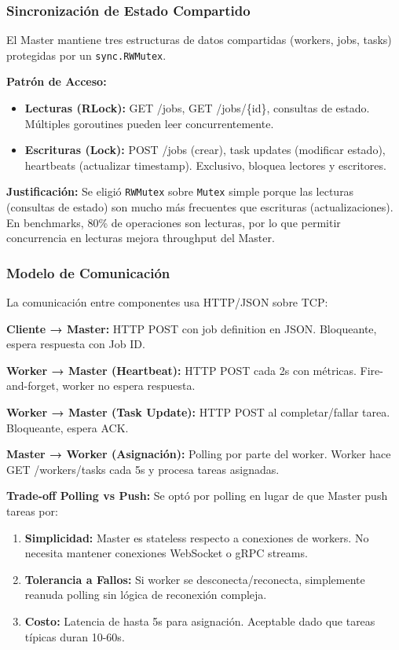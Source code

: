 \documentclass[conference]{IEEEtran}
\begin{document}
\subsubsection{Sincronización de Estado Compartido}

El Master mantiene tres estructuras de datos compartidas (workers, jobs, tasks) protegidas por un \texttt{sync.RWMutex}.

\textbf{Patrón de Acceso:}
\begin{itemize}
\item \textbf{Lecturas (RLock):} GET /jobs, GET /jobs/\{id\}, consultas de estado. Múltiples goroutines pueden leer concurrentemente.
\item \textbf{Escrituras (Lock):} POST /jobs (crear), task updates (modificar estado), heartbeats (actualizar timestamp). Exclusivo, bloquea lectores y escritores.
\end{itemize}

\textbf{Justificación:} Se eligió \texttt{RWMutex} sobre \texttt{Mutex} simple porque las lecturas (consultas de estado) son mucho más frecuentes que escrituras (actualizaciones). En benchmarks, 80\% de operaciones son lecturas, por lo que permitir concurrencia en lecturas mejora throughput del Master.

\subsubsection{Modelo de Comunicación}

La comunicación entre componentes usa HTTP/JSON sobre TCP:

\textbf{Cliente → Master:} HTTP POST con job definition en JSON. Bloqueante, espera respuesta con Job ID.

\textbf{Worker → Master (Heartbeat):} HTTP POST cada 2s con métricas. Fire-and-forget, worker no espera respuesta.

\textbf{Worker → Master (Task Update):} HTTP POST al completar/fallar tarea. Bloqueante, espera ACK.

\textbf{Master → Worker (Asignación):} Polling por parte del worker. Worker hace GET /workers/tasks cada 5s y procesa tareas asignadas.

\textbf{Trade-off Polling vs Push:} Se optó por polling en lugar de que Master push tareas por:
\begin{enumerate}
\item \textbf{Simplicidad:} Master es stateless respecto a conexiones de workers. No necesita mantener conexiones WebSocket o gRPC streams.
\item \textbf{Tolerancia a Fallos:} Si worker se desconecta/reconecta, simplemente reanuda polling sin lógica de reconexión compleja.
\item \textbf{Costo:} Latencia de hasta 5s para asignación. Aceptable dado que tareas típicas duran 10-60s.
\end{enumerate}
\end{document}
